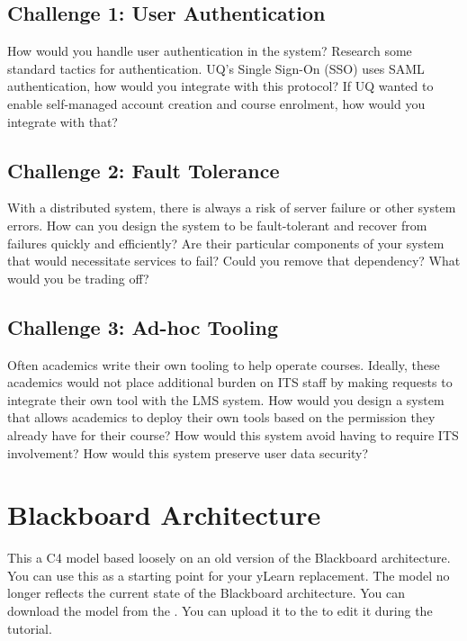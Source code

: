 \documentclass{csse4400}
\begin{document}
\subsection*{Challenge 1: User Authentication}
How would you handle user authentication in the system?
Research some standard tactics for authentication.
UQ's Single Sign-On (SSO) uses SAML authentication,
how would you integrate with this protocol?
If UQ wanted to enable self-managed account creation and course enrolment,
how would you integrate with that?

\subsection*{Challenge 2: Fault Tolerance}
With a distributed system,
there is always a risk of server failure or other system errors.
How can you design the system to be fault-tolerant and recover from failures quickly and efficiently?
Are their particular components of your system that would necessitate services to fail?
Could you remove that dependency?
What would you be trading off?

\subsection*{Challenge 3: Ad-hoc Tooling}
Often academics write their own tooling to help operate courses.
Ideally, these academics would not place additional burden on ITS staff by making requests to integrate their own tool with the LMS system.
How would you design a system that allows academics to deploy their own tools based on the permission they already have for their course?
How would this system avoid having to require ITS involvement?
How would this system preserve user data security?


\appendix

\section{Blackboard Architecture}
This a C4 model based loosely on an old version of the Blackboard architecture.
You can use this as a starting point for your yLearn replacement.
The model no longer reflects the current state of the Blackboard architecture.
You can download the model from the .
You can upload it to the  to edit it during the tutorial.
\end{document}
